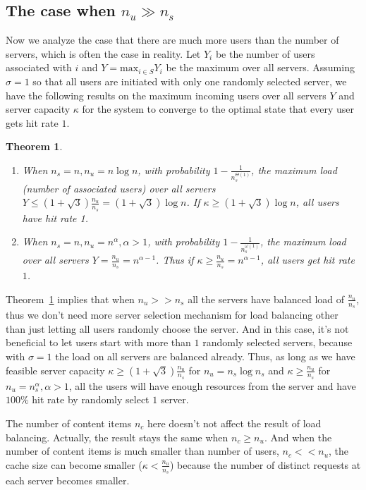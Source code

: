 \documentclass[conference]{IEEEtran}
\newtheorem{theorem}{Theorem}
\begin{document}
\subsection{The case when $n_u\gg n_s$}\label{sec:nu>ns}
Now we analyze the case that there are much more users than the number of servers, which is often the case in reality. 
Let $Y_i$ be the number of users associated with $i$ and $Y=\text{max}_{i\in S} Y_i$ be the maximum over all servers.  
Assuming $\sigma=1$ so that all users are initiated with only one randomly selected server, we have the following results on the maximum incoming users over all servers $Y$ and server capacity $\kappa$ for the system to converge to the optimal state that every user gets hit rate $1$.
\begin{theorem}
\label{lem:nu>ns}
\begin{enumerate}
\item When $n_s=n, n_u = n\log n$, with probability $1 - \frac{1}{n_s^{\Theta(1)}}$,  the maximum load (number of associated users) over all servers $Y\leq(1+\sqrt{3})\frac{n_u}{n_s} =(1+\sqrt{3})\log n$. If $\kappa\geq (1+\sqrt{3})\log n$, all users have hit rate 1.\\
\item When $n_s=n, n_u = n^{\alpha}, \alpha>1$, with probability $1 - \frac{1}{n_s^{\omega(1)}}$, the maximum load over all servers $Y=\frac{n_u}{n_s}=n^{\alpha-1}$. Thus if $\kappa\geq \frac{n_u}{n_s} = n^{\alpha-1}$, all users get hit rate $1$.
\end{enumerate}
\end{theorem}

Theorem~\ref{lem:nu>ns} implies that when $n_u>> n_s$ all the servers have balanced load of $\frac{n_u}{n_s}$, thus we don't need more server selection mechanism for load balancing other than just letting all users randomly choose the server. And in this case, it's not beneficial to let users start with more than $1$ randomly selected servers, because with $\sigma=1$ the load on all servers are balanced already. Thus, as long as we have feasible server capacity $\kappa\geq(1+\sqrt{3})\frac{n_u}{n_s}$ for $n_u=n_s\log n_s$ and $\kappa\geq\frac{n_u}{n_s}$ for $n_u=n_s^{\alpha}, \alpha>1$, all the users will have enough resources from the server and have $100\%$ hit rate by randomly select $1$ server.

The number of content items $n_c$ here doesn't not affect the result of load balancing. Actually, the result stays the same when $n_c\geq n_u$. And when the number of content items is much smaller than number of users, $n_c<<n_u$, the cache size can become smaller ($\kappa < \frac{n_u}{n_s}$) because the number of distinct requests at each server becomes smaller.
\end{document}

